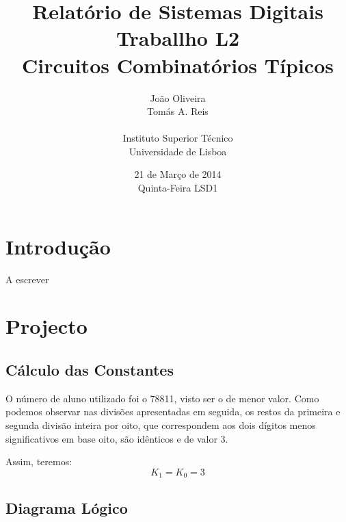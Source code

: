 \documentclass[a4paper,12pt]{article}
\begin{document}
\renewcommand{\sfdefault}{lmss}
\renewcommand{\familydefault}{\sfdefault}
\selectfont

\title{\bf Relatório de Sistemas Digitais \\
Traballho L2\\
Circuitos Combinatórios Típicos}
\author{João Oliveira\\
Tomás A. Reis\\
\\
Instituto Superior Técnico \\
Universidade de Lisboa}
\date{21 de Março de 2014 \\
Quinta-Feira LSD1}
\maketitle

\pagebreak
\section{Introdução}
A escrever


\section{Projecto}
\subsection{Cálculo das Constantes}
O número de aluno utilizado foi o 78811, visto ser o de menor valor. Como podemos observar nas divisões apresentadas em seguida, os restos da primeira e segunda divisão inteira por oito, que correspondem aos dois dígitos menos significativos em base oito, são idênticos e de valor 3. 
\par
\vspace*{1\baselineskip}
\:\:\:\:\:\: 
\vspace*{1\baselineskip}
\par
Assim, teremos:
\begin{equation}
K_1=K_0=3
\end{equation}
\subsection{Diagrama Lógico}
\end{document}
